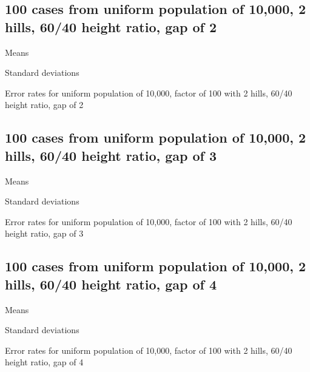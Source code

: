 \subsection{100 cases from uniform population of 10,000, 2 hills, 60/40 height ratio, gap of 2}
\begin{table}[H]
\centering
\scriptsize

    \begin{subtable}{0.5\textwidth}
    
    \caption{Means} 
    \end{subtable}%
    \begin{subtable}{0.5\textwidth}
    
    \caption{Standard deviations} 
    \end{subtable}

\caption{Error rates for uniform population of 10,000, factor of 100 with 2 hills, 60/40 height ratio, gap of 2}
\label{tbl:mean_error_rates:unif_100_1_2h_2}
\end{table}

\subsection{100 cases from uniform population of 10,000, 2 hills, 60/40 height ratio, gap of 3}
\begin{table}[H]
\centering
\scriptsize

    \begin{subtable}{0.5\textwidth}
    
    \caption{Means} 
    \end{subtable}%
    \begin{subtable}{0.5\textwidth}
    
    \caption{Standard deviations} 
    \end{subtable}

\caption{Error rates for uniform population of 10,000, factor of 100 with 2 hills, 60/40 height ratio, gap of 3}
\label{tbl:mean_error_rates:unif_100_1_2h_3}
\end{table}
\subsection{100 cases from uniform population of 10,000, 2 hills, 60/40 height ratio, gap of 4}
\begin{table}[H]
\centering
\scriptsize

    \begin{subtable}{0.5\textwidth}
    
    \caption{Means} 
    \end{subtable}%
    \begin{subtable}{0.5\textwidth}
    
    \caption{Standard deviations} 
    \end{subtable}

\caption{Error rates for uniform population of 10,000, factor of 100 with 2 hills, 60/40 height ratio, gap of 4}
\label{tbl:mean_error_rates:unif_100_1_2h_4}
\end{table}


